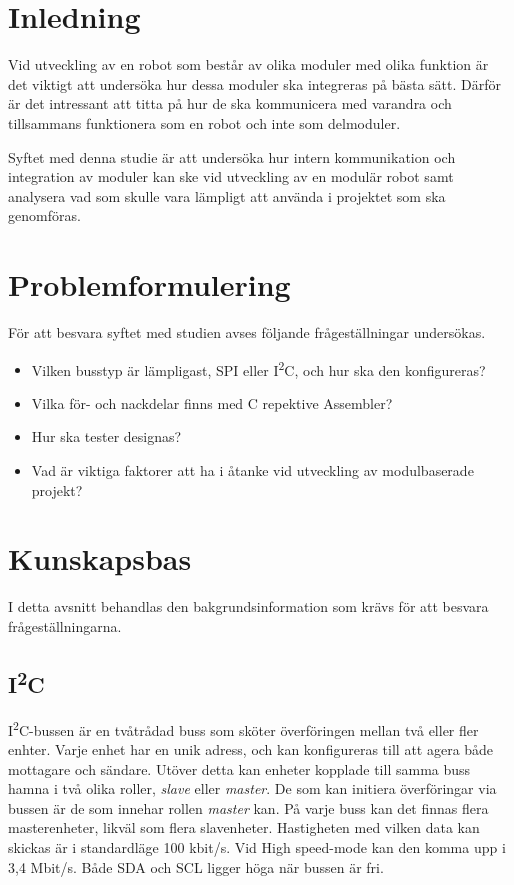 \documentclass[11pt]{article}
\begin{document}
\begin{flushleft}

\section{Inledning}
Vid utveckling av en robot som består av olika moduler med olika funktion är det viktigt att undersöka hur dessa moduler ska integreras på bästa sätt. Därför är det intressant att titta på hur de ska kommunicera med varandra och tillsammans funktionera som en robot och inte som delmoduler. 

Syftet med denna studie är att undersöka hur intern kommunikation och integration av moduler kan ske vid utveckling av en modulär robot samt analysera vad som skulle vara lämpligt att använda i projektet som ska genomföras.

\section{Problemformulering}
För att besvara syftet med studien avses följande frågeställningar undersökas.

\begin{itemize}
	\item Vilken busstyp är lämpligast, SPI eller I\textsuperscript{2}C, och hur ska den konfigureras?
	\item Vilka för- och nackdelar finns med C repektive Assembler? 
	\item Hur ska tester designas?
	\item Vad är viktiga faktorer att ha i åtanke vid utveckling av modulbaserade projekt?
\end{itemize}

\pagebreak

\section{Kunskapsbas}
I detta avsnitt behandlas den bakgrundsinformation som krävs för att besvara frågeställningarna.

\subsection{I\textsuperscript{2}C}

I\textsuperscript{2}C-bussen är en tvåtrådad buss som sköter överföringen mellan två eller fler enhter. Varje enhet har en unik adress, och kan konfigureras till att agera både mottagare och sändare. Utöver detta kan enheter kopplade till samma buss hamna i två olika roller, \textit{slave} eller \textit{master}. De som kan initiera överföringar via bussen är de som innehar rollen \textit{master} kan. På varje buss kan det finnas flera masterenheter, likväl som flera slavenheter. Hastigheten med vilken data kan skickas är i standardläge 100 kbit/s. Vid High speed-mode kan den komma upp i 3,4 Mbit/s. Både SDA och SCL ligger höga när bussen är fri.


\end{flushleft}
\end{document}
